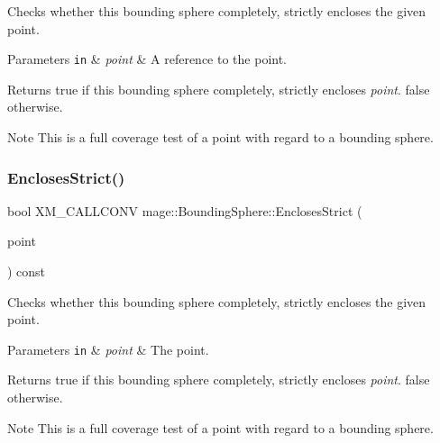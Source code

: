 Checks whether this bounding sphere completely, strictly encloses the given point.


\begin{DoxyParams}[1]{Parameters}
\mbox{\tt in}  & {\em point} & A reference to the point. \\
\hline
\end{DoxyParams}
\begin{DoxyReturn}{Returns}
{\ttfamily true} if this bounding sphere completely, strictly encloses {\itshape point}. {\ttfamily false} otherwise. 
\end{DoxyReturn}
\begin{DoxyNote}{Note}
This is a full coverage test of a point with regard to a bounding sphere. 
\end{DoxyNote}
\mbox{\label{classmage_1_1_bounding_sphere_ad75f41a261dd2e366457543b6150718a}} 
\subsubsection{\texorpdfstring{Encloses\+Strict()}{EnclosesStrict()}\hspace{0.1cm}{\footnotesize\ttfamily [2/4]}}
{\footnotesize\ttfamily bool X\+M\+\_\+\+C\+A\+L\+L\+C\+O\+NV mage\+::\+Bounding\+Sphere\+::\+Encloses\+Strict (\begin{DoxyParamCaption}\item[{F\+X\+M\+V\+E\+C\+T\+OR}]{point }\end{DoxyParamCaption}) const\hspace{0.3cm}{\ttfamily [noexcept]}}

Checks whether this bounding sphere completely, strictly encloses the given point.


\begin{DoxyParams}[1]{Parameters}
\mbox{\tt in}  & {\em point} & The point. \\
\hline
\end{DoxyParams}
\begin{DoxyReturn}{Returns}
{\ttfamily true} if this bounding sphere completely, strictly encloses {\itshape point}. {\ttfamily false} otherwise. 
\end{DoxyReturn}
\begin{DoxyNote}{Note}
This is a full coverage test of a point with regard to a bounding sphere. 
\end{DoxyNote}
\mbox{\label{classmage_1_1_bounding_sphere_ac1598f0dcef439855f203fbd6357e6f7}} 
